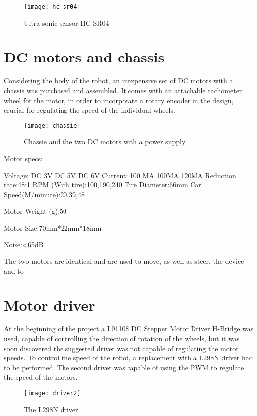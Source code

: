\begin{figure}[h]
\centering
\texttt{[image: hc-sr04]}
\caption{Ultra sonic sensor HC-SR04}
\label{fig::hcsr04}
\end{figure}

\section{DC motors and chassis} 

Considering the body of the robot, an inexpensive set of DC motors with a chassis was purchased and assembled. It comes with an attachable tachometer wheel for the motor, in order to incorporate a rotary encoder in the design, crucial for regulating the speed of the individual wheels.\cite{Motorref}

\begin{figure}[h]
\centering
\texttt{[image: chassie]}
\caption{Chassie and the two DC motors with a power supply}
\label{fig::chassie}
\end{figure}

Motor specs:

Voltage:
DC 3V
DC 5V
DC 6V
Current:
100 MA
100MA
120MA
Reduction rate:48:1
RPM (With tire):100,190,240
Tire Diameter:66mm
Car Speed(M/minute):20,39,48

Motor Weight (g):50

Motor Size:70mm*22mm*18mm

Noise:<65dB 

The two motors are identical and are used to move, as well as steer, the device and to 

\section{Motor driver} 

At the beginning of the project a L9110S DC Stepper Motor Driver H-Bridge was used, capable of controlling the direction of rotation of the wheels, but it was soon discovered the suggested driver was not capable of regulating the motor speeds.
To control the speed of the robot, a replacement with a L298N driver had to be performed.
The second driver was capable of using the PWM to regulate the speed of the motors.

\begin{figure}[h]
\centering
\texttt{[image: driver2]}
\caption{The L298N driver}
\label{fig::driver2}
\end{figure}

